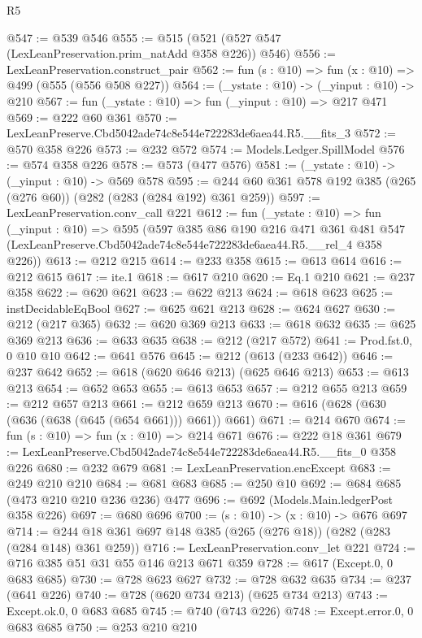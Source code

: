 \begin{lexlean}{R5}
\begin{coremodule}
@547 := @539 @546
@555 := @515 (@521 (@527 @547 (LexLeanPreservation.prim_natAdd @358 @226)) @546)
@556 := LexLeanPreservation.construct_pair
@562 := fun (s : @10) => fun (x : @10) => @499 (@555 (@556 @508 @227))
@564 := (_ystate : @10) -> (_yinput : @10) -> @210
@567 := fun (_ystate : @10) => fun (_yinput : @10) => @217 @471
@569 := @222 @60 @361
@570 := LexLeanPreserve.Cbd5042ade74c8e544e722283de6aea44.R5.__fits_3
@572 := @570 @358 @226
@573 := @232 @572
@574 := Models.Ledger.SpillModel
@576 := @574 @358 @226
@578 := @573 (@477 @576)
@581 := (_ystate : @10) -> (_yinput : @10) -> @569 @578
@595 := @244 @60 @361 @578 @192 @385 (@265 (@276 @60)) (@282 (@283 (@284 @192) @361 @259))
@597 := LexLeanPreservation.conv_call @221
@612 := fun (_ystate : @10) =>
  fun (_yinput : @10) =>
  @595
    (@597
      @385
      @86
      @190
      @216
      @471
      @361
      @481
      @547
      (LexLeanPreserve.Cbd5042ade74c8e544e722283de6aea44.R5.__rel_4 @358 @226))
@613 := @212 @215
@614 := @233 @358
@615 := @613 @614
@616 := @212 @615
@617 := ite.{1}
@618 := @617 @210
@620 := Eq.{1} @210
@621 := @237 @358
@622 := @620 @621
@623 := @622 @213
@624 := @618 @623
@625 := instDecidableEqBool
@627 := @625 @621 @213
@628 := @624 @627
@630 := @212 (@217 @365)
@632 := @620 @369 @213
@633 := @618 @632
@635 := @625 @369 @213
@636 := @633 @635
@638 := @212 (@217 @572)
@641 := Prod.fst.{0, 0} @10 @10
@642 := @641 @576
@645 := @212 (@613 (@233 @642))
@646 := @237 @642
@652 := @618 (@620 @646 @213) (@625 @646 @213)
@653 := @613 @213
@654 := @652 @653
@655 := @613 @653
@657 := @212 @655 @213
@659 := @212 @657 @213
@661 := @212 @659 @213
@670 := @616 (@628 (@630 (@636 (@638 (@645 (@654 @661))) @661)) @661)
@671 := @214 @670
@674 := fun (s : @10) => fun (x : @10) => @214 @671
@676 := @222 @18 @361
@679 := LexLeanPreserve.Cbd5042ade74c8e544e722283de6aea44.R5.__fits_0 @358 @226
@680 := @232 @679
@681 := LexLeanPreservation.encExcept
@683 := @249 @210 @210
@684 := @681 @683
@685 := @250 @10
@692 := @684 @685 (@473 @210 @210 @236 @236) @477
@696 := @692 (Models.Main.ledgerPost @358 @226)
@697 := @680 @696
@700 := (s : @10) -> (x : @10) -> @676 @697
@714 := @244 @18 @361 @697 @148 @385 (@265 (@276 @18)) (@282 (@283 (@284 @148) @361 @259))
@716 := LexLeanPreservation.conv_let @221
@724 := @716 @385 @51 @31 @55 @146 @213 @671 @359
@728 := @617 (Except.{0, 0} @683 @685)
@730 := @728 @623 @627
@732 := @728 @632 @635
@734 := @237 (@641 @226)
@740 := @728 (@620 @734 @213) (@625 @734 @213)
@743 := Except.ok.{0, 0} @683 @685
@745 := @740 (@743 @226)
@748 := Except.error.{0, 0} @683 @685
@750 := @253 @210 @210

\end{coremodule}
\end{lexlean}
